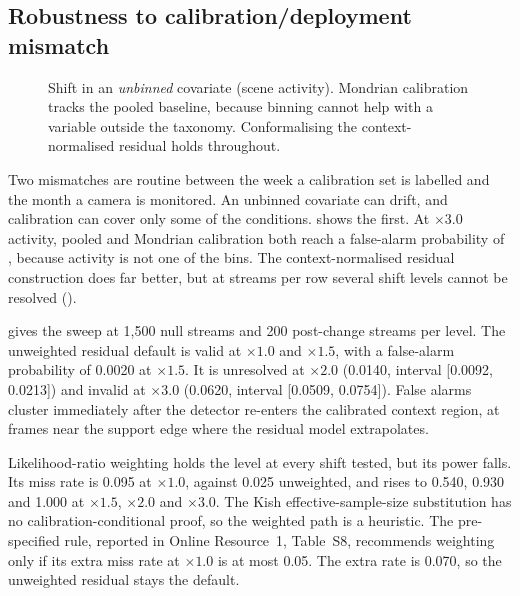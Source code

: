 \subsection{Robustness to calibration/deployment mismatch}
\label{sec:shift}

\begin{figure}[t]
  \centering
  \caption{Shift in an \emph{unbinned} covariate (scene activity). Mondrian calibration tracks the pooled baseline, because binning cannot help
  with a variable outside the taxonomy. Conformalising the context-normalised
  residual holds throughout.}
  \label{fig:shift}
\end{figure}


Two mismatches are routine between the week a calibration set is labelled and the
month a camera is monitored. An unbinned covariate can drift, and calibration can
cover only some of the conditions.  shows the first. At
$\times 3.0$ activity, pooled and Mondrian calibration both reach a false-alarm
probability of \ShiftPooledPfa{}, because activity is not one of the bins. The
context-normalised residual construction does far better, but at \ExpThreeReps{} streams per
row several shift levels cannot be resolved (\ShiftResidualUnresolvedRatios{}).


 gives the sweep at 1,500 null streams and 200 post-change streams per level. The unweighted residual default is valid at $\times 1.0$ and $\times 1.5$, with a false-alarm probability of 0.0020 at $\times 1.5$. It is unresolved at $\times 2.0$ (0.0140, interval [0.0092, 0.0213]) and invalid at $\times 3.0$ (0.0620, interval [0.0509, 0.0754]). False alarms cluster immediately after the detector re-enters the calibrated context region, at frames near the support edge where the residual model extrapolates.

Likelihood-ratio weighting holds the level at every shift tested, but its power falls. Its miss rate is 0.095 at $\times 1.0$, against 0.025 unweighted, and rises to 0.540, 0.930 and 1.000 at $\times 1.5$, $\times 2.0$ and $\times 3.0$. The Kish effective-sample-size substitution has no calibration-conditional proof, so the weighted path is a heuristic. The pre-specified rule, reported in Online Resource~1, Table~S8, recommends weighting only if its extra miss rate at $\times 1.0$ is at most 0.05. The extra rate is 0.070, so the unweighted residual stays the default.

